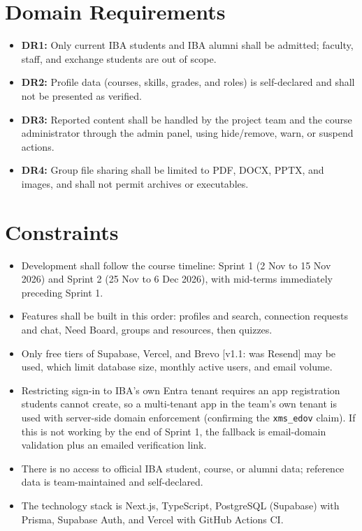 \documentclass[10pt,a4paper]{article}
\newcommand{\vone}[1]{\textcolor{accent}{\small[v1.1: #1]}}
\begin{document}
\section{Domain Requirements}
\begin{itemize}
\item \textbf{DR1:} Only current IBA students and IBA alumni shall be admitted; faculty, staff, and exchange students are out of scope.
\item \textbf{DR2:} Profile data (courses, skills, grades, and roles) is self-declared and shall not be presented as verified.
\item \textbf{DR3:} Reported content shall be handled by the project team and the course administrator through the admin panel, using hide/remove, warn, or suspend actions.
\item \textbf{DR4:} Group file sharing shall be limited to PDF, DOCX, PPTX, and images, and shall not permit archives or executables.
\end{itemize}

\section{Constraints}
\begin{itemize}
\item Development shall follow the course timeline: Sprint 1 (2 Nov to 15 Nov 2026) and Sprint 2 (25 Nov to 6 Dec 2026), with mid-terms immediately preceding Sprint 1.
\item Features shall be built in this order: profiles and search, connection requests and chat, Need Board, groups and resources, then quizzes.
\item Only free tiers of Supabase, Vercel, and Brevo \vone{was Resend} may be used, which limit database size, monthly active users, and email volume.
\item Restricting sign-in to IBA's own Entra tenant requires an app registration students cannot create, so a multi-tenant app in the team's own tenant is used with server-side domain enforcement (confirming the \texttt{xms\_edov} claim). If this is not working by the end of Sprint 1, the fallback is email-domain validation plus an emailed verification link.
\item There is no access to official IBA student, course, or alumni data; reference data is team-maintained and self-declared.
\item The technology stack is Next.js, TypeScript, PostgreSQL (Supabase) with Prisma, Supabase Auth, and Vercel with GitHub Actions CI.
\end{itemize}
\end{document}

